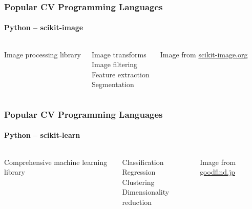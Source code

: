 \documentclass[xetex,professionalfont]{beamer}
\begin{document}

\begin{frame}
\frametitle{Popular CV Programming Languages}
\framesubtitle{Python -- scikit-image}

\begin{columns}

Image processing library

\bigskip
Image transforms\\\medskip
Image filtering\\\medskip
Feature extraction\\\medskip
Segmentation %


\begin{center}
{
	{\centering Image from \url{scikit-image.org}}}
\end{center}

\end{columns}

\end{frame}


\begin{frame}
\frametitle{Popular CV Programming Languages}
\framesubtitle{Python -- scikit-learn}

\begin{columns}

Comprehensive machine learning library

\bigskip
Classification\\\medskip
Regression\\\medskip
Clustering\\\medskip
Dimensionality reduction


\begin{center}
{
	{\centering Image from \url{goodfind.jp}}}
\end{center}

\end{columns}

\end{frame}
\end{document}
